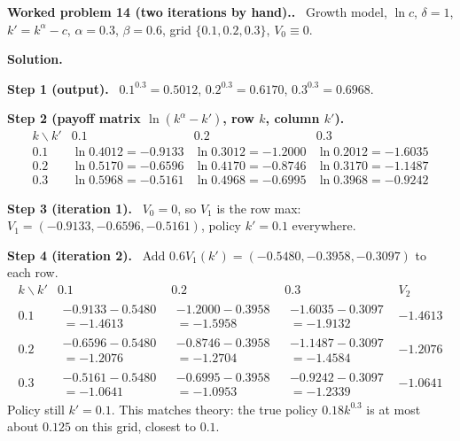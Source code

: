 \documentclass[12pt]{article}
\newcommand{\st}[1]{\par\smallskip\textbf{Step #1.}\ }
\newcommand{\prob}[1]{\par\bigskip\textbf{Worked problem #1.}\ }
\newcommand{\sol}{\par\smallskip\textbf{Solution.}\par}
\begin{document}
\prob{14 (two iterations by hand).} Growth model, $\ln c$, $\delta=1$, $k'=k^\alpha-c$, $\alpha=0.3$, $\beta=0.6$, grid $\{0.1,0.2,0.3\}$, $V_0\equiv0$.
\sol
\st{1 (output)} $0.1^{0.3}=0.5012$, $0.2^{0.3}=0.6170$, $0.3^{0.3}=0.6968$.
\st{2 (payoff matrix $\ln(k^\alpha-k')$, row $k$, column $k'$)}
\[
\begin{array}{c|ccc}
k\backslash k'&0.1&0.2&0.3\\\hline
0.1&\ln0.4012=-0.9133&\ln0.3012=-1.2000&\ln0.2012=-1.6035\\
0.2&\ln0.5170=-0.6596&\ln0.4170=-0.8746&\ln0.3170=-1.1487\\
0.3&\ln0.5968=-0.5161&\ln0.4968=-0.6995&\ln0.3968=-0.9242
\end{array}
\]
\st{3 (iteration 1)} $V_0=0$, so $V_1$ is the row max: $V_1=(-0.9133,-0.6596,-0.5161)$, policy $k'=0.1$ everywhere.
\st{4 (iteration 2)} Add $0.6V_1(k')=(-0.5480,-0.3958,-0.3097)$ to each row.
\[
\renewcommand{\arraystretch}{1.3}
\begin{array}{c|ccc|c}
k\backslash k'&0.1&0.2&0.3&V_2\\\hline
0.1&\begin{array}{c}-0.9133-0.5480\\=-1.4613\end{array}&\begin{array}{c}-1.2000-0.3958\\=-1.5958\end{array}&\begin{array}{c}-1.6035-0.3097\\=-1.9132\end{array}&-1.4613\\
0.2&\begin{array}{c}-0.6596-0.5480\\=-1.2076\end{array}&\begin{array}{c}-0.8746-0.3958\\=-1.2704\end{array}&\begin{array}{c}-1.1487-0.3097\\=-1.4584\end{array}&-1.2076\\
0.3&\begin{array}{c}-0.5161-0.5480\\=-1.0641\end{array}&\begin{array}{c}-0.6995-0.3958\\=-1.0953\end{array}&\begin{array}{c}-0.9242-0.3097\\=-1.2339\end{array}&-1.0641
\end{array}
\]
Policy still $k'=0.1$. This matches theory: the true policy $0.18k^{0.3}$ is at most about $0.125$ on this grid, closest to $0.1$.
\end{document}
